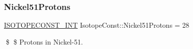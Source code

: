 \subsubsection{\texorpdfstring{Nickel51\+Protons}{Nickel51Protons}}
{\footnotesize\ttfamily \mbox{\hyperlink{group___isotope_const-_macros_ga5f18360b3e99483a35c32d789e62621c}{I\+S\+O\+T\+O\+P\+E\+C\+O\+N\+S\+T\+\_\+\+I\+NT}} Isotope\+Const\+::\+Nickel51\+Protons = 28}

\$ \$ Protons in Nickel-\/51. 